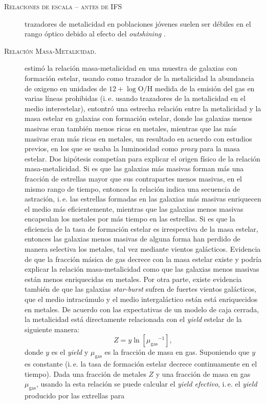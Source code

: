 \documentclass[xcolor=dvipsnames,4pt,hyperref={colorlinks,citecolor=black,linkcolor=black,urlcolor=black}]{beamer}
\begin{document}
\begin{frame}[allowframebreaks]{\textsc{Relaciones de escala -- antes de IFS}}
\begin{description}
trazadores de metalicidad en poblaciones jóvenes suelen ser débiles en el rango óptico debido al
efecto del \emph{outshining} \citep[e.\,g.][]{Conroy2013a}.
%
\item[\textsc{Relación Masa-Metalicidad.}] \citet{Tremonti2004} estimó la relación masa-metalicidad
en una muestra de galaxias con formación estelar, usando como trazador de la metalicidad la
abundancia de oxigeno en unidades de $12+\log{\text{O}/\text{H}}$ medida de la emisión del gas en
varias líneas prohibidas (i.\,e. usando trazadores de la metalicidad en el medio interestelar),
entontró una estrecha relación entre la metalicidad y la masa estelar en galaxias con formación
estelar, donde las galaxias menos masivas eran también menos ricas en metales, mientras que las más
masivas eran más ricas en metales, un resultado en acuerdo con estudios previos, en los que se usaba
la luminosidad como \emph{proxy} para la masa estelar. Dos hipótesis competían para explicar el
origen físico de la relación masa-metalicidad. Si es que las galaxias más masivas forman más una
fracción de estrellas mayor que sus contrapartes menos masivas, en el mismo rango de tiempo,
entonces la relación indica una secuencia de astración, i.\,e. las estrellas formadas en las
galaxias más masivas enriquecen el medio más eficientemente, mientras que las galaxias menos masivas
encapsulan los metales por más tiempo en las estrellas. Si es que la eficiencia de la tasa de
formación estelar es irrespectiva de la masa estelar, entonces las galaxias menos masivas de alguna
forma han perdido de manera selectiva los metales, tal vez mediante vientos galácticos. Evidencia de
que la fracción másica de gas decrece con la masa estelar existe \citep{Bell2000} y podría explicar
la relación masa-metalicidad como que las galaxias menos masivas están menos enriquecidas en
metales. Por otra parte, existe evidencia también de que las galaxias \emph{star-burst} sufren de
fuertes vientos galácticos, que el medio intracúmulo y el medio intergaláctico están está
enriquecidos en metales.
%
De acuerdo con las expectativas de un modelo de caja cerrada, la metalicidad está directamente
relacionada con el \emph{yield} estelar de la siguiente manera:
%
$$
Z = y\ln{\left[{\mu_\text{gas}}^{-1}\right]},
$$
%
donde $y$ es el \emph{yield} y $\mu_\text{gas}$ es la fracción de masa en gas. Suponiendo que $y$ es
constante (i.\,e. la tasa de formación estelar decrece continuamente en el tiempo). Dada una
fracción de metales $Z$ y una fracción de masa en gas $\mu_\text{gas}$, usando la esta relación se
puede calcular el \emph{yield efectivo}, i.\,e. el \emph{yield} producido por las extrellas para

\end{description}
\end{frame}
\end{document}

